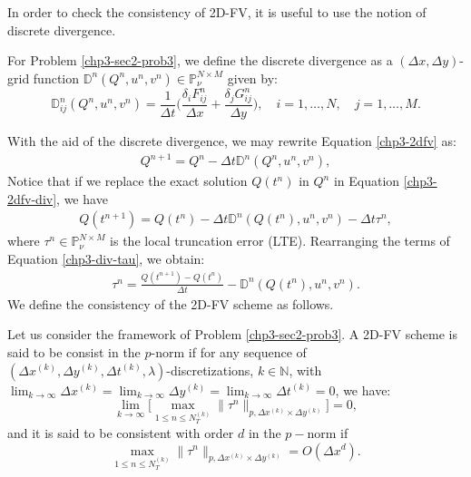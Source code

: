 In order to check the consistency of 2D-FV, it is useful to use the notion of discrete divergence.
\begin{definition}
	\label{chp3-def-div}
	For Problem \ref{chp3-sec2-prob3}, we define the discrete divergence as a 
    $(\Delta x, \Delta y)$-grid function $\mathbb{D}^n(Q^n,u^n,v^n) \in \mathbb{P}^{N\times M}_{\nu}$
	given by:
	\begin{equation}
		\label{chp3-def-div-eq}
		\mathbb{D}_{ij}^n(Q^n,u^n,v^n)=  \frac{1}{\Delta t}
        \bigg(\frac{\delta_i {F}_{ij}^{n}}{\Delta x} + \frac{\delta_j {G}_{ij}^{n}}{\Delta y} \bigg), 
        \quad i = 1, \ldots, N, \quad j=1, \ldots,M.
	\end{equation}
\end{definition}
With the aid of the discrete divergence, we may rewrite Equation \eqref{chp3-2dfv} as:
\begin{align}
    \label{chp3-2dfv-div}
    {Q}^{n+1} =  {Q}^{n} - \Delta t \mathbb{D}^n(Q^n,u^n,v^n),
\end{align}
Notice that if we replace the exact solution $Q(t^n)$ in $Q^n$ in Equation \eqref{chp3-2dfv-div}, we have
\begin{align}
    \label{chp3-div-tau}
    {Q}(t^{n+1}) =  {Q}(t^{n}) - \Delta t \mathbb{D}^n(Q(t^n),u^n,v^n) - \Delta t \tau^n,
\end{align}
where $\tau^n \in \mathbb{P}^{N\times M}_{\nu}$ is the local truncation error (LTE).
Rearranging the terms of Equation \eqref{chp3-div-tau}, we obtain:
\begin{align}
    \label{chp3-div-tau2}
    \tau^n =  \frac{{Q}(t^{n+1}) - {Q}(t^{n})}{\Delta t} - \mathbb{D}^n(Q(t^n),u^n,v^n).
\end{align}
We define the consistency of the 2D-FV scheme as follows.
\begin{definition}[Consistency]
	\label{chp3-def-cons}
	Let us consider the framework of Problem \ref{chp3-sec2-prob3}.
	A 2D-FV scheme is said to be consist in the $p$-norm if for any sequence of
	$(\Delta x^{(k)},\Delta y^{(k)}, \Delta t^{(k)},\lambda)$-discretizations, 
	$k \in \mathbb{N}$, with
    $\lim_{k\to \infty }{\Delta x^{(k)}} =\lim_{k\to \infty }{\Delta y^{(k)}}= \lim_{k\to \infty }{\Delta t^{(k)}} = 0$, we have:
	\begin{equation*}
		\lim_{k \to \infty}\bigg[ {\max_{1\leq n\leq N_T^{(k)}}}{\|\tau^n\|_{p,\Delta x^{(k)} \times \Delta y^{(k)}}} \bigg] = 0,
	\end{equation*}
	and it is said to be consistent with order $d$ in the $p-$norm if
	\begin{equation*}
		{\max_{1\leq n\leq N_T^{(k)}}}{\|\tau^n\|_{p,\Delta x^{(k)} \times \Delta y^{(k)}}} = O(\Delta x^d).
	\end{equation*}
\end{definition}
